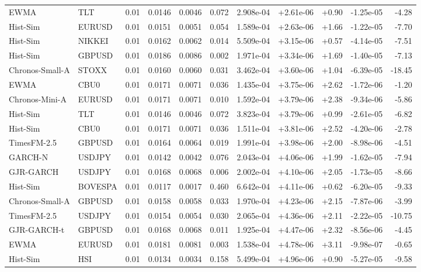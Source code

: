 \begin{tabular}{llrrrrrrrrr}
EWMA & TLT & 0.01 & 0.0146 & 0.0046 & 0.072 & 2.908e-04 & +2.61e-06 & +0.90 & -1.25e-05 & -4.28 \\
Hist-Sim & EURUSD & 0.01 & 0.0151 & 0.0051 & 0.054 & 1.589e-04 & +2.63e-06 & +1.66 & -1.22e-05 & -7.70 \\
Hist-Sim & NIKKEI & 0.01 & 0.0162 & 0.0062 & 0.014 & 5.509e-04 & +3.15e-06 & +0.57 & -4.14e-05 & -7.51 \\
Hist-Sim & GBPUSD & 0.01 & 0.0186 & 0.0086 & 0.002 & 1.971e-04 & +3.34e-06 & +1.69 & -1.40e-05 & -7.13 \\
Chronos-Small-A & STOXX & 0.01 & 0.0160 & 0.0060 & 0.031 & 3.462e-04 & +3.60e-06 & +1.04 & -6.39e-05 & -18.45 \\
EWMA & CBU0 & 0.01 & 0.0171 & 0.0071 & 0.036 & 1.435e-04 & +3.75e-06 & +2.62 & -1.72e-06 & -1.20 \\
Chronos-Mini-A & EURUSD & 0.01 & 0.0171 & 0.0071 & 0.010 & 1.592e-04 & +3.79e-06 & +2.38 & -9.34e-06 & -5.86 \\
Hist-Sim & TLT & 0.01 & 0.0146 & 0.0046 & 0.072 & 3.823e-04 & +3.79e-06 & +0.99 & -2.61e-05 & -6.82 \\
Hist-Sim & CBU0 & 0.01 & 0.0171 & 0.0071 & 0.036 & 1.511e-04 & +3.81e-06 & +2.52 & -4.20e-06 & -2.78 \\
TimesFM-2.5 & GBPUSD & 0.01 & 0.0164 & 0.0064 & 0.019 & 1.991e-04 & +3.98e-06 & +2.00 & -8.98e-06 & -4.51 \\
GARCH-N & USDJPY & 0.01 & 0.0142 & 0.0042 & 0.076 & 2.043e-04 & +4.06e-06 & +1.99 & -1.62e-05 & -7.94 \\
GJR-GARCH & USDJPY & 0.01 & 0.0168 & 0.0068 & 0.006 & 2.002e-04 & +4.10e-06 & +2.05 & -1.73e-05 & -8.66 \\
Hist-Sim & BOVESPA & 0.01 & 0.0117 & 0.0017 & 0.460 & 6.642e-04 & +4.11e-06 & +0.62 & -6.20e-05 & -9.33 \\
Chronos-Small-A & GBPUSD & 0.01 & 0.0158 & 0.0058 & 0.033 & 1.970e-04 & +4.23e-06 & +2.15 & -7.87e-06 & -3.99 \\
TimesFM-2.5 & USDJPY & 0.01 & 0.0154 & 0.0054 & 0.030 & 2.065e-04 & +4.36e-06 & +2.11 & -2.22e-05 & -10.75 \\
GJR-GARCH-t & GBPUSD & 0.01 & 0.0168 & 0.0068 & 0.011 & 1.925e-04 & +4.47e-06 & +2.32 & -8.56e-06 & -4.45 \\
EWMA & EURUSD & 0.01 & 0.0181 & 0.0081 & 0.003 & 1.538e-04 & +4.78e-06 & +3.11 & -9.98e-07 & -0.65 \\
Hist-Sim & HSI & 0.01 & 0.0134 & 0.0034 & 0.158 & 5.499e-04 & +4.96e-06 & +0.90 & -5.27e-05 & -9.58 \\

\end{tabular}

